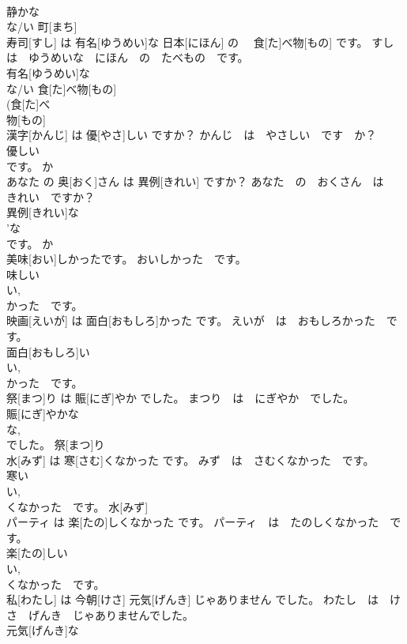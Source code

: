 \documentclass[8pt]{extreport}
\begin{document}
\begin{CJK}{UTF8}{min}
\\	静かな 
\\	な/い	町[まち] 
\\	寿司[すし] は 有名[ゆうめい]な 日本[にほん] の　 食[た]べ物[もの] です。	すし　は　ゆうめいな　にほん　の　たべもの　です。	
\\	有名[ゆうめい]な 
\\	な/い	食[た]べ物[もの] 
\\	(食[た]べ 
\\	物[もの] 
\\	漢字[かんじ] は 優[やさ]しい ですか？	かんじ　は　やさしい　です　か？	
\\	優しい 
\\	です。	か 
\\	あなた の 奥[おく]さん は 異例[きれい] ですか？	あなた　の　おくさん　は　きれい　ですか？	
\\	異例[きれい]な 
\\	'な
\\	です。	か 
\\	美味[おい]しかったです。	おいしかった　です。	
\\	味しい 
\\	い, 
\\	かった　です。				
\\	映画[えいが] は 面白[おもしろ]かった です。	えいが　は　おもしろかった　です。	
\\	面白[おもしろ]い 
\\	い, 
\\	かった　です。				
\\	祭[まつ]り は 賑[にぎ]やか でした。	まつり　は　にぎやか　でした。	
\\	賑[にぎ]やかな 
\\	な, 
\\	でした。	祭[まつ]り 
\\	水[みず] は 寒[さむ]くなかった です。	みず　は　さむくなかった　です。	
\\	寒い 
\\	い, 
\\	くなかった　です。	水[みず] 
\\	パーティ は 楽[たの]しくなかった です。	パーティ　は　たのしくなかった　です。	
\\	楽[たの]しい 
\\	い, 
\\	くなかった　です。				
\\	私[わたし] は 今朝[けさ] 元気[げんき] じゃありません でした。	わたし　は　けさ　げんき　じゃありませんでした。	
\\	元気[げんき]な 

\end{CJK}
\end{document}
